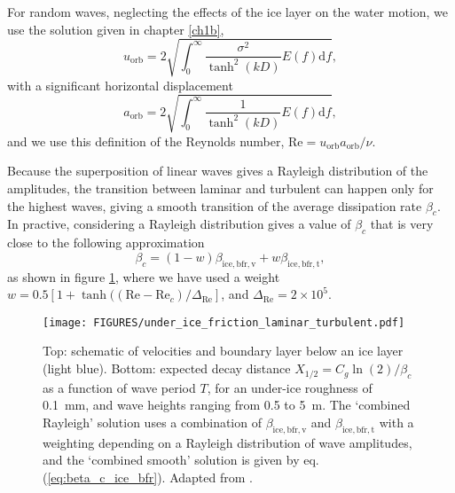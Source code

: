 For random waves, neglecting the effects of the 
ice layer on the water motion, we use the solution given in chapter \ref{ch1b}, 
\begin{equation}
u_{\mathrm{orb}}= 2\sqrt{\int_0^\infty \frac{\sigma^2}{\tanh^2(kD)} E(f) \mathrm{d}f },
\end{equation}
with a significant horizontal displacement
\begin{equation}
a_{\mathrm{orb}}= 2\sqrt{\int_0^\infty  \frac{1}{\tanh^2(kD)}E(f) \mathrm{d}f },
\end{equation}
and we use this definition of the Reynolds number, $\mathrm{Re} = u_{\mathrm{orb}} a_{\mathrm{orb}} /\nu$.

Because the superposition of linear waves gives a Rayleigh distribution of the amplitudes, the transition between laminar and turbulent 
can happen only for the highest waves, giving a smooth transition of the average dissipation rate $\beta_c$. In practive, considering a Rayleigh distribution gives a value of $\beta_c$ that is very close to the following approximation 
\begin{equation}
\beta_c= (1-w)  \beta_{\mathrm{ice,bfr,v}} + w \beta_{\mathrm{ice,bfr,t}},\label{eq:beta_c_ice_bfr}
\end{equation}
as shown in figure \ref{fig:under_ice_friction}, where we have used a weight $w=0.5 \left[1 + \tanh((\mathrm{Re}-\mathrm{Re}_c)/\Delta_{\mathrm{Re}}\right]$, and $\Delta_{\mathrm{Re}}=2 \times 10^5$.
\begin{figure}[htb]
\centerline{\texttt{[image: FIGURES/under\_ice\_friction\_laminar\_turbulent.pdf]}}
  \caption{Top: schematic of velocities and boundary layer below an ice layer (light blue). Bottom: expected decay distance $X_{1/2}=C_g \ln(2)/\beta_c $ as a function of wave period $T$, for an under-ice roughness of 0.1~mm, and wave heights ranging from 0.5 to 5~m. The `combined Rayleigh' solution uses a combination of $\beta_{\mathrm{ice,bfr,v}}$ and $\beta_{\mathrm{ice,bfr,t}}$ with a weighting depending on a Rayleigh distribution of wave amplitudes, and the `combined smooth' solution is given by eq. (\ref{eq:beta_c_ice_bfr}). Adapted from \cite{Stopa&al.2016}.} \label{fig:under_ice_friction}
\end{figure}

